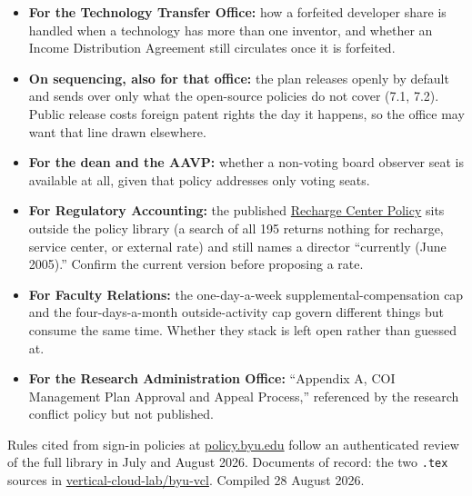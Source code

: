\documentclass[11pt]{article}
\begin{document}
\begin{itemize}
\item \textbf{For the Technology Transfer Office:} how a forfeited developer
share is handled when a technology has more than one inventor, and whether an
Income Distribution Agreement still circulates once it is forfeited.
\item \textbf{On sequencing, also for that office:} the plan releases openly by
default and sends over only what the open-source policies do not cover (7.1,
7.2). Public release costs foreign patent rights the day it happens, so the
office may want that line drawn elsewhere.
\item \textbf{For the dean and the AAVP:} whether a non-voting board observer
seat is available at all, given that policy addresses only voting seats.
\item \textbf{For Regulatory Accounting:} the published
\href{https://spo.byu.edu/00000190-3687-d777-a591-37af392d0001/rechargecenterpolicyprocedures-pdf}{Recharge
Center Policy} sits outside the policy library (a search of all 195 returns
nothing for recharge, service center, or external rate) and still names a
director ``currently (June 2005).'' Confirm the current version before
proposing a rate.
\item \textbf{For Faculty Relations:} the one-day-a-week
supplemental-compensation cap and the four-days-a-month outside-activity cap
govern different things but consume the same time. Whether they stack is left
open rather than guessed at.
\item \textbf{For the Research Administration Office:} ``Appendix A, COI
Management Plan Approval and Appeal Process,'' referenced by the research
conflict policy but not published.
\end{itemize}

\vspace{6pt}
{\color{metagray}\footnotesize\noindent
Rules cited from sign-in policies at
\href{https://policy.byu.edu}{policy.byu.edu} follow an authenticated review of
the full library in July and August 2026. Documents of record: the two
\texttt{.tex} sources in
\href{https://github.com/vertical-cloud-lab/byu-vcl}{vertical-cloud-lab/byu-vcl}.
Compiled 28 August 2026.}
\end{document}
